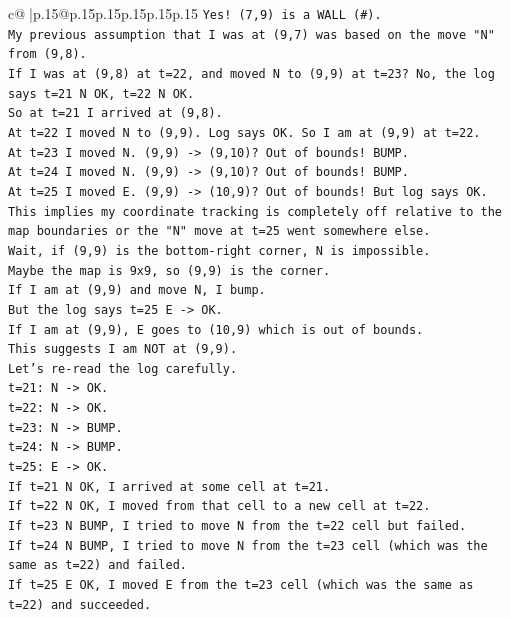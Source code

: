 \documentclass{article}
\begin{document}
{\begin{supertabular}{c@{$\;$}|p{.15\linewidth}@{}p{.15\linewidth}p{.15\linewidth}p{.15\linewidth}p{.15\linewidth}p{.15\linewidth}}
{{{\texttt{Yes! (7,9) is a WALL (\#).} \\
\texttt{My previous assumption that I was at (9,7) was based on the move "N" from (9,8).} \\
\texttt{If I was at (9,8) at t=22, and moved N to (9,9) at t=23? No, the log says t=21 N OK, t=22 N OK.} \\
\texttt{So at t=21 I arrived at (9,8).} \\
\texttt{At t=22 I moved N to (9,9). Log says OK. So I am at (9,9) at t=22.} \\
\texttt{At t=23 I moved N. (9,9) {-}> (9,10)? Out of bounds! BUMP.} \\
\texttt{At t=24 I moved N. (9,9) {-}> (9,10)? Out of bounds! BUMP.} \\
\texttt{At t=25 I moved E. (9,9) {-}> (10,9)? Out of bounds! But log says OK.} \\
\texttt{This implies my coordinate tracking is completely off relative to the map boundaries or the "N" move at t=25 went somewhere else.} \\
\texttt{Wait, if (9,9) is the bottom{-}right corner, N is impossible.} \\
\texttt{Maybe the map is 9x9, so (9,9) is the corner.} \\
\texttt{If I am at (9,9) and move N, I bump.} \\
\texttt{But the log says t=25 E {-}> OK.} \\
\texttt{If I am at (9,9), E goes to (10,9) which is out of bounds.} \\
\texttt{This suggests I am NOT at (9,9).} \\
\texttt{Let's re{-}read the log carefully.} \\
\texttt{t=21: N {-}> OK.} \\
\texttt{t=22: N {-}> OK.} \\
\texttt{t=23: N {-}> BUMP.} \\
\texttt{t=24: N {-}> BUMP.} \\
\texttt{t=25: E {-}> OK.} \\
\texttt{If t=21 N OK, I arrived at some cell at t=21.} \\
\texttt{If t=22 N OK, I moved from that cell to a new cell at t=22.} \\
\texttt{If t=23 N BUMP, I tried to move N from the t=22 cell but failed.} \\
\texttt{If t=24 N BUMP, I tried to move N from the t=23 cell (which was the same as t=22) and failed.} \\
\texttt{If t=25 E OK, I moved E from the t=23 cell (which was the same as t=22) and succeeded.} \\
}}}
\end{supertabular}}
\end{document}

